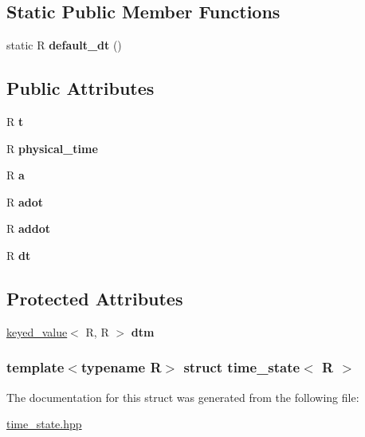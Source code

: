 \subsection*{Static Public Member Functions}
\begin{DoxyCompactItemize}
\item 
\hypertarget{structtime__state_a4b0e72b80ea35008c7022bcca39402bd}{
static R {\bfseries default\_\-dt} ()}
\label{structtime__state_a4b0e72b80ea35008c7022bcca39402bd}

\end{DoxyCompactItemize}
\subsection*{Public Attributes}
\begin{DoxyCompactItemize}
\item 
\hypertarget{structtime__state_abe9f5681bd175cf2c95846cd9242714f}{
R {\bfseries t}}
\label{structtime__state_abe9f5681bd175cf2c95846cd9242714f}

\item 
\hypertarget{structtime__state_aaa3077dc17a2e26b3df614c4731ec79e}{
R {\bfseries physical\_\-time}}
\label{structtime__state_aaa3077dc17a2e26b3df614c4731ec79e}

\item 
\hypertarget{structtime__state_afc42049df8fd72572900865bcd94d482}{
R {\bfseries a}}
\label{structtime__state_afc42049df8fd72572900865bcd94d482}

\item 
\hypertarget{structtime__state_ab97eafb749b43fae8f4f14b14f48369c}{
R {\bfseries adot}}
\label{structtime__state_ab97eafb749b43fae8f4f14b14f48369c}

\item 
\hypertarget{structtime__state_a67f019bfc07228a17c6458a2ab378668}{
R {\bfseries addot}}
\label{structtime__state_a67f019bfc07228a17c6458a2ab378668}

\item 
\hypertarget{structtime__state_a218510dd06e5bb674159c65944302034}{
R {\bfseries dt}}
\label{structtime__state_a218510dd06e5bb674159c65944302034}

\end{DoxyCompactItemize}
\subsection*{Protected Attributes}
\begin{DoxyCompactItemize}
\item 
\hypertarget{structtime__state_af2d38ab9dcf80b81c5ee07a259415a41}{
\hyperlink{structkeyed__value}{keyed\_\-value}$<$ R, R $>$ {\bfseries dtm}}
\label{structtime__state_af2d38ab9dcf80b81c5ee07a259415a41}

\end{DoxyCompactItemize}
\subsubsection*{template$<$typename R$>$ struct time\_\-state$<$ R $>$}



The documentation for this struct was generated from the following file:\begin{DoxyCompactItemize}
\item 
\hyperlink{time__state_8hpp}{time\_\-state.hpp}\end{DoxyCompactItemize}
